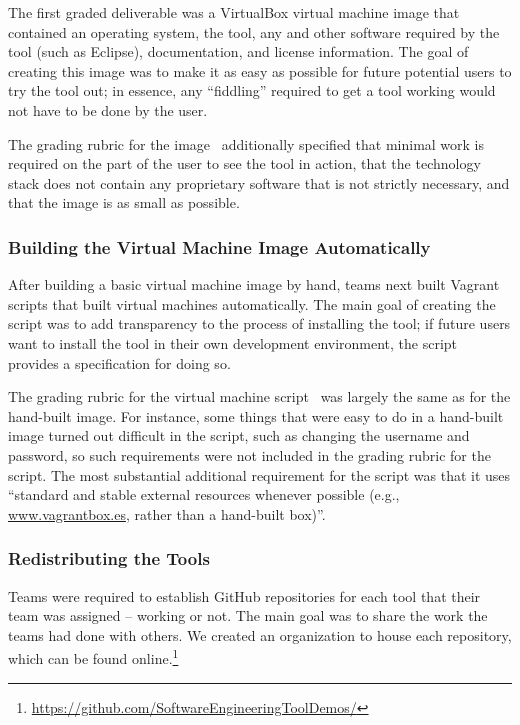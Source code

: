 \documentclass[10pt,conference]{IEEEtran}
\begin{document}
The first graded deliverable was a VirtualBox virtual machine
image that contained an operating system, the tool, any
and other software required by the tool (such as Eclipse),
documentation, and license information.
The goal of creating this image was to make it as
easy as possible for future potential users to try
the tool out; in essence, any ``fiddling'' required to get
a tool working would not have to be done by the user.

The grading rubric for the image~\cite{vm}
additionally specified that minimal work is required
on the part of the user to see the tool in action,
that the technology stack does not contain any proprietary 
software that is not strictly necessary,
and that the image is as small as possible.


\subsubsection{Building the Virtual Machine Image Automatically}

After building a basic virtual machine image by hand,
teams next built Vagrant scripts that built virtual machines
automatically.
The main goal of creating the script was to add 
transparency to the process
of installing the tool; if future users want to install the tool
in their own development environment, the script provides a
specification for doing so.

The grading rubric for the virtual machine 
script~\cite{vmscript}
was largely the same as for the hand-built image.
For instance, some things that were easy to do in a hand-built 
image turned out difficult in the script, such as changing 
the username and password, so such requirements were 
not included in the grading rubric for the script.
The most substantial additional requirement for the script
was that it uses ``standard and stable external resources 
whenever possible (e.g., \url{www.vagrantbox.es}, rather than a 
hand-built box)''.

\subsubsection{Redistributing the Tools}

Teams were required to establish GitHub repositories 
for each tool that their team was assigned -- working or not.
The main goal was to share the work the teams had 
done with others.
We created an organization to house each repository,
which can be found 
online.\footnote{\url{https://github.com/SoftwareEngineeringToolDemos/}}
\end{document}
